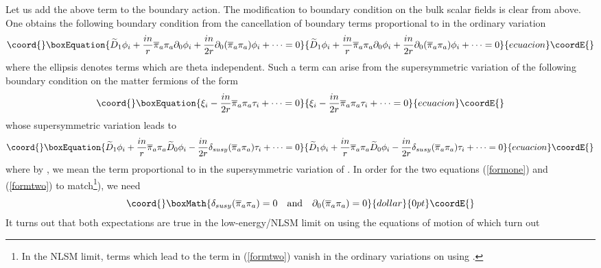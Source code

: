 \documentclass[a4paper,12pt]{article}
\begin{document}
Let us add the above term to the boundary action. The modification to
boundary condition on the bulk scalar fields is clear from above. 
One obtains the following boundary condition
from the cancellation of boundary terms proportional
to \myHighlight{$\delta\overline{\phi}$}\coordHE{} in the ordinary variation
\begin{equation}\coord{}\boxEquation{
\widetilde{D}_1 \phi_i +
{{in}\over{ r}}\overline{\pi}_a \pi_a  \partial_0\phi_i 
+{{in}\over{2 r}}\partial_0 (\overline{\pi}_a \pi_a)  \phi_i 
+ \cdots =0 \label{formone}
}{
\widetilde{D}_1 \phi_i +
{{in}\over{ r}}\overline{\pi}_a \pi_a  \partial_0\phi_i 
+{{in}\over{2 r}}\partial_0 (\overline{\pi}_a \pi_a)  \phi_i 
+ \cdots =0 }{ecuacion}\coordE{}\end{equation}
where the ellipsis denotes terms which are theta independent.
Such a term can arise from the supersymmetric variation of
the following boundary condition on the matter fermions of
the form
\begin{equation}\coord{}\boxEquation{
\xi_i - {{in}\over{2 r}} \overline{\pi}_a\pi_a  \tau_i  + \cdots =0 
}{
\xi_i - {{in}\over{2 r}} \overline{\pi}_a\pi_a  \tau_i  + \cdots =0 
}{ecuacion}\coordE{}\end{equation}
whose supersymmetric variation leads to
\begin{equation}\coord{}\boxEquation{
\widetilde{D}_1 \phi_i +{{in}\over{ r}}\overline{\pi}_a
\pi_a  \widetilde{D}_0\phi_i 
- {{in}\over{2 r}} \delta_{susy}(\overline{\pi}_a\pi_a) \tau_i
+ \cdots =0 \label{formtwo}
}{
\widetilde{D}_1 \phi_i +{{in}\over{ r}}\overline{\pi}_a
\pi_a  \widetilde{D}_0\phi_i 
- {{in}\over{2 r}} \delta_{susy}(\overline{\pi}_a\pi_a) \tau_i
+ \cdots =0 }{ecuacion}\coordE{}\end{equation}
where by \coordHE{}, we mean the
term proportional to \myHighlight{$\overline{\epsilon}$}\coordHE{} in the supersymmetric
variation of \coordHE{}. In order for the two
equations (\ref{formone}) and (\ref{formtwo}) to match\footnote{In the
NLSM limit, terms which lead to the \coordHE{} term in
(\ref{formtwo}) vanish in the ordinary variations on using
\coordHE{}.}), we need
$$\coord{}\boxMath{
\delta_{susy}(\overline{\pi}_a\pi_a)=0\quad{\rm and}\quad
\partial_0(\overline{\pi}_a\pi_a)=0
}{dollar}{0pt}\coordE{}$$
It turns out that both expectations are true in the low-energy/NLSM limit
on using the equations of motion of \coordHE{} which turn out
\end{document}
